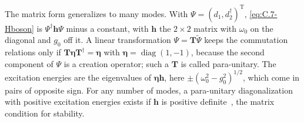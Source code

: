 The matrix form generalizes to many modes. With $\Psi = (d_1, d_2^\dagger)^{\mathrm{T}}$, \cref{eq:C.7-Hboson} is $\Psi^\dagger\mathbf{h}\Psi$ minus a constant, with $\mathbf{h}$ the $2\times2$ matrix with $\omega_0$ on the diagonal and $g_0$ off it. A linear transformation $\Psi = \mathbf{T}\tilde\Psi$ keeps the commutation relations only if $\mathbf{T}\boldsymbol{\eta}\mathbf{T}^\dagger = \boldsymbol{\eta}$ with $\boldsymbol{\eta} = \operatorname{diag}(1, -1)$, because the second component of $\Psi$ is a creation operator; such a $\mathbf{T}$ is called para-unitary. The excitation energies are the eigenvalues of $\boldsymbol{\eta}\mathbf{h}$, here $\pm(\omega_0^2 - g_0^2)^{1/2}$, which come in pairs of opposite sign. For any number of modes, a para-unitary diagonalization with positive excitation energies exists if $\mathbf{h}$ is positive definite~\cite{colpa1978diagonalization}, the matrix condition for stability.

